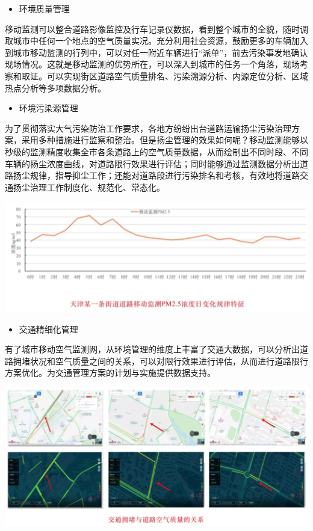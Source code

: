 \documentclass[]{book}
\providecommand{\tightlist}{%
  \setlength{\itemsep}{0pt}\setlength{\parskip}{0pt}}
\begin{document}
\begin{itemize}
\tightlist
\item
  环境质量管理
\end{itemize}

移动监测可以整合道路影像监控及行车记录仪数据，看到整个城市的全貌，随时调取城市中任何一个地点的空气质量实况。充分利用社会资源，鼓励更多的车辆加入到城市移动监测的行列中，可以对任一附近车辆进行``派单''，前去污染事发地确认现场情况。这就是移动监测的优势所在，可以深入到城市的任务一个角落，现场考察和取证。可以实现街区道路空气质量排名、污染溯源分析、内源定位分析、区域热点分析等多项数据分析。

\begin{itemize}
\tightlist
\item
  环境污染源管理
\end{itemize}

为了贯彻落实大气污染防治工作要求，各地方纷纷出台道路运输扬尘污染治理方案，采用多种措施进行监察和整治。但是扬尘管理的效果如何呢？移动监测能够以秒级的监测精度收集全市各条道路上的空气质量数据，从而绘制出不同时段、不同车辆的扬尘浓度曲线，对道路限行效果进行评估；同时能够通过监测数据分析出道路扬尘规律，指导抑尘工作；还能对道路段进行污染排名和考核，有效地将道路交通扬尘治理工作制度化、规范化、常态化。

\includegraphics[width=6.67in]{images/dlyd3}

\begin{itemize}
\tightlist
\item
  交通精细化管理
\end{itemize}

有了城市移动空气监测网，从环境管理的维度上丰富了交通大数据，可以分析出道路拥堵状况和空气质量之间的关系，可以对限行效果进行评估，从而进行道路限行方案优化。为交通管理方案的计划与实施提供数据支持。

\includegraphics[width=6.67in]{images/dlyd4}
\end{document}
